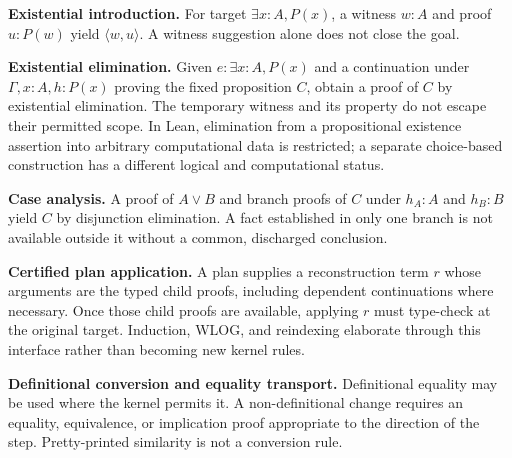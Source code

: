 \documentclass[11pt,a4paper]{article}
\theoremstyle{definition}
\theoremstyle{remark}
\numberwithin{equation}{section}
\begin{document}
\textbf{Existential introduction.} For target $\exists x:A,P(x)$, a witness $w:A$ and proof $u:P(w)$ yield $\langle w,u\rangle$. A witness suggestion alone does not close the goal.

\textbf{Existential elimination.} Given $e:\exists x:A,P(x)$ and a continuation under $\Gamma,x:A,h:P(x)$ proving the fixed proposition $C$, obtain a proof of $C$ by existential elimination. The temporary witness and its property do not escape their permitted scope. In Lean, elimination from a propositional existence assertion into arbitrary computational data is restricted; a separate choice-based construction has a different logical and computational status.\cite{lean-choice}

\textbf{Case analysis.} A proof of $A\lor B$ and branch proofs of $C$ under $h_A:A$ and $h_B:B$ yield $C$ by disjunction elimination. A fact established in only one branch is not available outside it without a common, discharged conclusion.

\textbf{Certified plan application.} A plan supplies a reconstruction term $r$ whose arguments are the typed child proofs, including dependent continuations where necessary. Once those child proofs are available, applying $r$ must type-check at the original target. Induction, WLOG, and reindexing elaborate through this interface rather than becoming new kernel rules.

\textbf{Definitional conversion and equality transport.} Definitional equality may be used where the kernel permits it. A non-definitional change requires an equality, equivalence, or implication proof appropriate to the direction of the step. Pretty-printed similarity is not a conversion rule.
\end{document}
